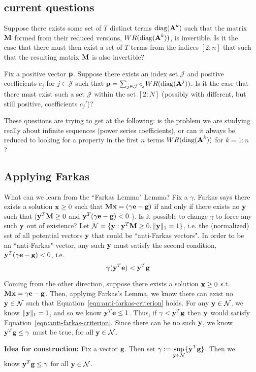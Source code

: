\subsection{current questions}

Suppose there exists some set of $T$ distinct terms $\operatorname{diag}(\textbf{A}^k)$ such that the matrix $\textbf{M}$
formed from their reduced versions, $WR(\operatorname{diag}(\textbf{A}^k))$, is invertible.
Is it the case that there must then exist a set of $T$ terms from the indices $[2:n]$ that such that the resulting matrix $\textbf{M}$ is also invertible?

Fix a positive vector $\textbf{p}$. Suppose there exists an index set $\mathcal{J}$
and positive coefficients $c_j$ for $j \in \mathcal{J}$ such that $\textbf{p} = \sum_{j\in\mathcal{J}} c_j WR(\operatorname{diag}(\textbf{A}^j))$.
Is it the case that there must exist such a set $\mathcal{J}$ within the set $[2:N]$ (possibly with different, but still positive, coefficients $c_j'$)?

These questions are trying to get at the following: is the problem we are studying really about infinite sequences (power series coefficients),
or can it always be reduced to looking for a property in the first $n$ terms $WR(\operatorname{diag}(\textbf{A}^k))$ for $k = 1:n$?

\subsection{Applying Farkas}

What can we learn from the ``Farkas Lemma" Lemma?  Fix a $\gamma$. Farkas says there exists a solution $\textbf{x} \geq 0 $ such that $\textbf{M}\textbf{x} = (\gamma\textbf{e} - \textbf{g})$ if and only if there exists no $\textbf{y}$ such that ($\textbf{y}^T\textbf{M} \geq 0$ and $\textbf{y}^T(\gamma\textbf{e} - \textbf{g}) < 0 $  ).
Is it possible to change $\gamma$ to force any such $\textbf{y}$ out of existence?
Let $\mathcal{N} = \{ \textbf{y} : \textbf{y}^T\textbf{M} \geq 0,  \|\textbf{y}\|_1 = 1 \}$, i.e. the (normalized) set of all potential vectors $\textbf{y}$ that could be ``anti-Farkas vectors".
In order to be an ``anti-Farkas" vector, any such $\textbf{y}$ must satisfy the second condition, $\textbf{y}^T(\gamma\textbf{e} - \textbf{g}) < 0 $, i.e.
\begin{equation}\label{eqn:anti-farkas-criterion}
  \gamma(\textbf{y}^T\textbf{e}) < \textbf{y}^T\textbf{g}
\end{equation}

Coming from the other direction, suppose there exists a solution $\textbf{x} \geq 0$ s.t. $\textbf{M}\textbf{x} = \gamma\textbf{e} - \textbf{g}$. Then, applying Farkas's Lemma, we know there can exist no $\textbf{y} \in \mathcal{N}$ such that Equation~\eqref{eqn:anti-farkas-criterion} holds.
For any $\textbf{y} \in \mathcal{N}$, we know $\|\textbf{y}\|_1 = 1$, and so we know $ \textbf{y}^T\textbf{e} \leq 1$. Thus, if $\gamma < \textbf{y}^T \textbf{g}$ then $\textbf{y}$ would satisfy Equation~\eqref{eqn:anti-farkas-criterion}.
Since there can be no such $\textbf{y}$, we know $\textbf{y}^T \textbf{g} \leq \gamma$ must be true, for all $\textbf{y} \in \mathcal{N}$.

\textbf{Idea for construction:}
Fix a vector $\textbf{g}$. Then set $\gamma := \displaystyle\sup_{ \textbf{y} \in \mathcal{N} } \{ \textbf{y}^T\textbf{g} \}$. Then we know $\textbf{y}^T \textbf{g} \leq \gamma$ for all $\textbf{y} \in \mathcal{N}$.
